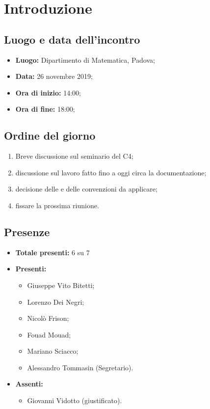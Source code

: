 \section*{Introduzione}

\subsection*{Luogo e data dell'incontro}
	\begin{itemize}
		\item \textbf{Luogo:} Dipartimento di Matematica, Padova;
		\item \textbf{Data:} 26 novembre 2019;
		\item \textbf{Ora di inizio:} 14:00;
		\item \textbf{Ora di fine:} 18:00;

	\end{itemize}

\subsection*{Ordine del giorno}
	\begin{enumerate}

		\item Breve discussione sul seminario del  C4;
		\item discussione sul lavoro fatto fino a oggi circa la documentazione;
		\item decisione delle  e delle convenzioni da applicare;
		\item fissare la prossima riunione.

	\end{enumerate}

\subsection*{Presenze}
	\begin{itemize}
		\item \textbf{Totale presenti:} 6 su 7
		\item \textbf{Presenti: }

			\begin{itemize}
				\item Giuseppe Vito Bitetti;
				\item Lorenzo Dei Negri;
				\item Nicolò Frison;
				\item Fouad Mouad;
				\item Mariano Sciacco;

				\item Alessandro Tommasin (Segretario).
			\end{itemize}
		\item \textbf{Assenti: } 
			\begin{itemize}	

				\item Giovanni Vidotto (giustificato).
			\end{itemize}
	\end{itemize}


